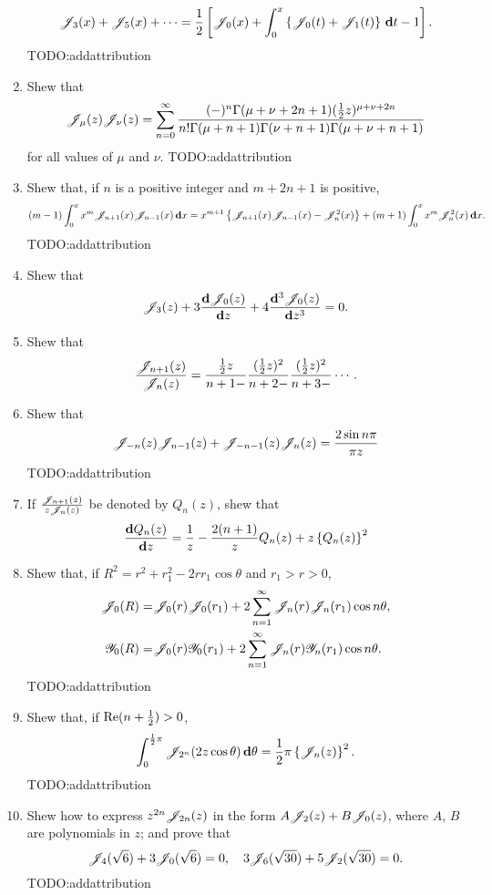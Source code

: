\documentclass{book}
\begin{document}
\begin{enumerate}
$$  \mathscr{J}_{3}(x)
  +
  \mathscr{J}_{5}(x)
  +
  \cdots
  =
  \frac{1}{2}
  \left[ 
    \mathscr{J}_{0}(x)
    +
    \int_{0}^{x}
    \left\{ 
      \mathscr{J}_{0}(t) + \mathscr{J}_{1}(t)
     \right\}
    \, \mathbf{d} t
    -
    1
     \right].
  $$
  TODO:addattribution
\item
  Shew that
  $$
  \mathscr{J}_{\mu}(z) \mathscr{J}_{\nu}(z)
  =
  \sum_{n=0}^{\infty}
  \frac{(-)^{n} \Gamma(\mu+\nu+2n+1) (\frac{1}{2} z)^{\mu+\nu+2n}}{
    n! \Gamma(\mu+n+1) \Gamma(\nu+n+1) \Gamma(\mu+\nu+n+1)}
  $$
  for all values of $\mu$ and $\nu$.
  TODO:addattribution
\item
  Shew that, if $n$ is a positive integer and $m+2n+1$ is positive,
  $$
  (m-1)
  \int_{0}^{x}
  x^{m} \mathscr{J}_{n+1}(x) \mathscr{J}_{n-1}(x)
  \, \mathbf{d} x
  =
  x^{m+1}
  \left\{ 
    \mathscr{J}_{n+1}(x)\mathscr{J}_{n-1}(x) - \mathscr{J}_{n}^{2}(x)
   \right\}
  +
  (m+1)
  \int_{0}^{x} x^{m} \mathscr{J}_{n}^{2}(x)
  \, \mathbf{d} x.
  $$
  TODO:addattribution
\item
  Shew that
  $$
  \mathscr{J}_{3}(z)
  +
  3 \frac{\mathbf{d} \mathscr{J}_{0}(z)}{\mathbf{d} z}
  +
  4 \frac{\mathbf{d}^{3} \mathscr{J}_{0}(z)}{\mathbf{d} z^{3}}
  =
  0.
  $$
\item
  Shew that
  $$
  \frac{\mathscr{J}_{n+1}(z)}{\mathscr{J}_{n}(z)}
  =
  \frac{ \frac{1}{2} z }{n+1-}
  \frac{ (\frac{1}{2} z)^{2} }{n+2-}
  \frac{ (\frac{1}{2} z)^{2} }{n+3-}
  \cdots.
  $$
\item
  Shew that
  $$
  \mathscr{J}_{-n}(z) \mathscr{J}_{n-1}(z)
  +
  \mathscr{J}_{-n-1}(z) \mathscr{J}_{n}(z)
  =
  \frac{2 \sin n\pi}{\pi z}
  $$
  TODO:addattribution
\item
  If $\frac{\mathscr{J}_{n+1}(z)}{z \mathscr{J}_{n}(z)}$ be denoted by $Q_{n}(z)$,
  shew that
  $$
  \frac{ \mathbf{d} Q_{n}(z) }{\mathbf{d} z}
  =
  \frac{1}{z}
  -
  \frac{2(n+1)}{z}
  Q_{n}(z)
  +
  z \left\{  Q_{n}(z)  \right\}^{2}
  $$
\item
  Shew that, if
  $R^{2} = r^{2} + r_{1}^{2} - 2rr_{1}\cos\theta$
  and
  $r_{1} > r > 0$,
  \begin{align*}
    \mathscr{J}_{0}(R)
    =&
    \mathscr{J}_{0}(r) \mathscr{J}_{0}(r_{1})
    +
    2 \sum_{n=1}^{\infty} \mathscr{J}_{n}(r) \mathscr{J}_{n}(r_{1}) \cos n\theta,
    \\
    \mathscr{Y}_{0}(R)
    =&
    \mathscr{J}_{0}(r) \mathscr{Y}_{0}(r_{1})
    +
    2 \sum_{n=1}^{\infty} \mathscr{J}_{n}(r) \mathscr{Y}_{n}(r_{1}) \cos n\theta.
  \end{align*}
  TODO:addattribution
\item
  Shew that, if $\mathrm{Re}(n+\frac{1}{2}) > 0$,
  $$
  \int_{0}^{\frac{1}{2}\pi}
  \mathscr{J}_{2^{n}}(2z\cos\theta) \, \mathbf{d} \theta
  =
  \frac{1}{2}\pi \left\{  \mathscr{J}_{n}(z)  \right\}^{2}.
  $$
  TODO:addattribution
\item
  Shew how to express $z^{2n} \mathscr{J}_{2n}(z)$ in the form
  $A \mathscr{J}_{2}(z) + B \mathscr{J}_{0}(z)$, where $A$, $B$ are polynomials in
  $z$; and prove that
  $$
  \mathscr{J}_{4}(\sqrt{6}) + 3 \mathscr{J}_{0}(\sqrt{6}) = 0,
  \quad
  3 \mathscr{J}_{6}(\sqrt{30}) + 5 \mathscr{J}_{2}(\sqrt{30}) = 0.
  $$
  TODO:addattribution
\end{enumerate}
\end{document}
